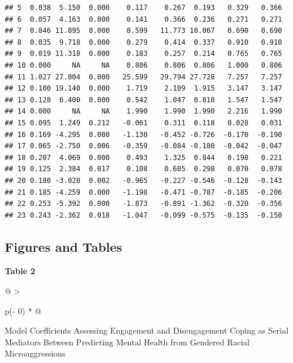\documentclass[
  11pt,
]{book}
\begin{document}
\begin{verbatim}
## 5  0.038  5.150  0.000    0.117    0.267  0.193   0.329   0.366
## 6  0.057  4.163  0.000    0.141    0.366  0.236   0.271   0.271
## 7  0.846 11.895  0.000    8.599   11.773 10.067   0.690   0.690
## 8  0.035  9.718  0.000    0.279    0.414  0.337   0.910   0.910
## 9  0.019 11.318  0.000    0.183    0.257  0.214   0.765   0.765
## 10 0.000     NA     NA    0.806    0.806  0.806   1.000   0.806
## 11 1.027 27.004  0.000   25.599   29.794 27.728   7.257   7.257
## 12 0.100 19.140  0.000    1.719    2.109  1.915   3.147   3.147
## 13 0.128  6.400  0.000    0.542    1.047  0.818   1.547   1.547
## 14 0.000     NA     NA    1.990    1.990  1.990   2.216   1.990
## 15 0.095  1.249  0.212   -0.061    0.311  0.118   0.028   0.031
## 16 0.169 -4.295  0.000   -1.130   -0.452 -0.726  -0.170  -0.190
## 17 0.065 -2.750  0.006   -0.359   -0.084 -0.180  -0.042  -0.047
## 18 0.207  4.069  0.000    0.493    1.325  0.844   0.198   0.221
## 19 0.125  2.384  0.017    0.108    0.605  0.298   0.070   0.078
## 20 0.180 -3.028  0.002   -0.965   -0.227 -0.546  -0.128  -0.143
## 21 0.185 -4.259  0.000   -1.198   -0.471 -0.787  -0.185  -0.206
## 22 0.253 -5.392  0.000   -1.873   -0.891 -1.362  -0.320  -0.356
## 23 0.243 -2.362  0.018   -1.047   -0.099 -0.575  -0.135  -0.150
\end{verbatim}

\hypertarget{figures-and-tables-2}{%
\subsection{Figures and Tables}\label{figures-and-tables-2}}

\textbf{Table 2 }

\begin{longtable}[]{@{}
  >{\raggedright\arraybackslash}p{(\columnwidth - 0\tabcolsep) * }@{}}
\toprule\noalign{}
\begin{minipage}[b]{\linewidth}\raggedright
Model Coefficients Assessing Engagement and Disengagement Coping as Serial Mediators Between Predicting Mental Health from Gendered Racial Microaggressions
\end{minipage} \\
\midrule\noalign{}
\endhead
\bottomrule\noalign{}
\endlastfoot
\end{longtable}
\end{document}
